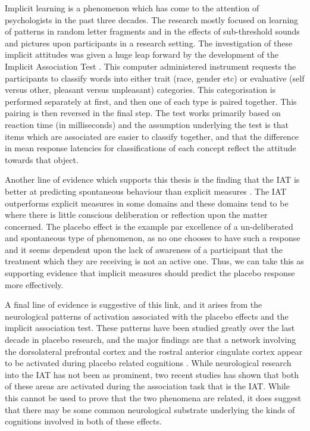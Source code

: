 Implicit learning is a phenomenon which has come to the attention of psychologists in the past three decades. The research mostly focused on learning of patterns in random letter fragments and in the effects of sub-threshold sounds and pictures upon participants in a research setting. The investigation of these implicit attitudes was given a huge leap forward by the development of the Implicit Association Test \cite{Greenwald1998}. This computer administered instrument requests the participants to classify words into either trait (race, gender etc) or evaluative (self versus other, pleasant versus unpleasant) categories. This categorisation is performed separately at first, and then one of each type is paired together. This pairing is then reversed in the final step. The test works primarily based on reaction time (in milliseconds) and the assumption underlying the test is that items which are associated are easier to classify together, and that the difference in mean response latencies for classifications of each concept reflect the attitude towards that object. 


Another line of evidence which supports this thesis is the finding that the IAT is better at predicting spontaneous behaviour than explicit measures \cite{Conner2005,Hofmann2005}. The IAT outperforms explicit measures in some domains \cite{Greenwald2009} and these domains tend to be where there is little conscious deliberation or reflection upon the matter concerned. The placebo effect is the example par excellence of a un-deliberated and spontaneous  type of phenomenon, as no one chooses to have such a response and it seems dependent upon the lack of awareness of a participant that the treatment which they are receiving is not an active one. Thus, we can take this as supporting evidence that implicit measures should predict the placebo response more effectively. 

A final line of evidence is suggestive of this link, and it arises from the neurological patterns of activation associated with the placebo effects and the implicit association test. These patterns have been studied greatly over the last decade in placebo research, and the major findings are that a network involving the dorsolateral prefrontal cortex and the rostral anterior cingulate cortex appear to be activated during placebo related cognitions \cite{Mayberg2002,Zubieta2006}. While neurological research into the IAT has not been as prominent, two recent studies  \cite{Knutson2007,Knutson2006} has shown that both of these areas are activated during the association task that is the IAT. While this cannot be used to prove that the two phenomena are related, it does suggest that there may be some common neurological substrate underlying the kinds of cognitions involved in both of these effects. 

